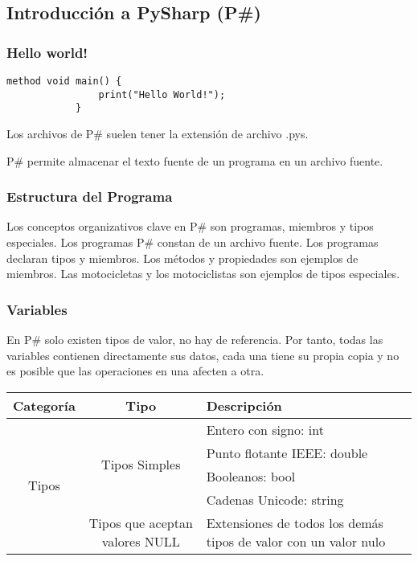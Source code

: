 \subsection{Introducción a PySharp (P\#)}
	\subsubsection{Hello world!}
	
		\begin{lstlisting}[language={PySharp}]
			method void main() {
				print("Hello World!");
			}
		\end{lstlisting}	
		Los archivos de P\# suelen tener la extensión de archivo .pys.\par
		
		P\# permite almacenar el texto fuente de un programa en un archivo fuente.	
		
	\subsubsection{Estructura del Programa}
		Los conceptos organizativos clave en P\# son programas, miembros y tipos especiales. Los programas P\# constan de un archivo fuente. Los programas declaran tipos y miembros. Los métodos y propiedades son ejemplos de miembros. Las motocicletas y los motociclistas son ejemplos de tipos especiales.
		
	\subsubsection{Variables}
		En P\# solo existen tipos de valor, no hay de referencia. Por tanto, todas las variables contienen directamente sus datos, cada una tiene su propia copia y no es posible que las operaciones en una afecten a otra.\par
		\begin{center}
			\begin{tabular}{| c | c | m{5cm} | }
				\hline
				Categoría & Tipo & Descripción \\ \hline
				\multirow{5}{*}{Tipos} & \multirow{4}{*}{Tipos Simples} & Entero con signo: int \\ \cline{3-3}
				 &  & Punto flotante IEEE: double \\ \cline{3-3}
				 &  & Booleanos: bool \\ \cline{3-3}
				 &  & Cadenas Unicode: string \\ \cline{2-3}
				 & Tipos que aceptan valores NULL & Extensiones de todos los demás tipos de valor con un valor nulo \\ \hline
			\end{tabular}
		\end{center}
